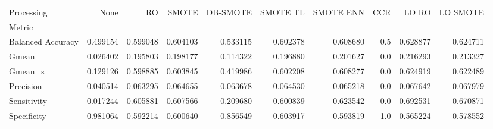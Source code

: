 \begin{tabular}{lrrrrrrrrr}
\toprule
Processing &      None &        RO &     SMOTE &  DB-SMOTE &  SMOTE TL &  SMOTE ENN &  CCR &     LO RO &  LO SMOTE \\
Metric            &           &           &           &           &           &            &      &           &           \\
\midrule
Balanced Accuracy &  0.499154 &  0.599048 &  0.604103 &  0.533115 &  0.602378 &   0.608680 &  0.5 &  0.628877 &  0.624711 \\
Gmean             &  0.026402 &  0.195803 &  0.198177 &  0.114322 &  0.196880 &   0.201627 &  0.0 &  0.216293 &  0.213327 \\
Gmean_s           &  0.129126 &  0.598885 &  0.603845 &  0.419986 &  0.602208 &   0.608277 &  0.0 &  0.624919 &  0.622489 \\
Precision         &  0.040514 &  0.063295 &  0.064655 &  0.063678 &  0.064530 &   0.065218 &  0.0 &  0.067642 &  0.067979 \\
Sensitivity       &  0.017244 &  0.605881 &  0.607566 &  0.209680 &  0.600839 &   0.623542 &  0.0 &  0.692531 &  0.670871 \\
Specificity       &  0.981064 &  0.592214 &  0.600640 &  0.856549 &  0.603917 &   0.593819 &  1.0 &  0.565224 &  0.578552 \\
\bottomrule
\end{tabular}
